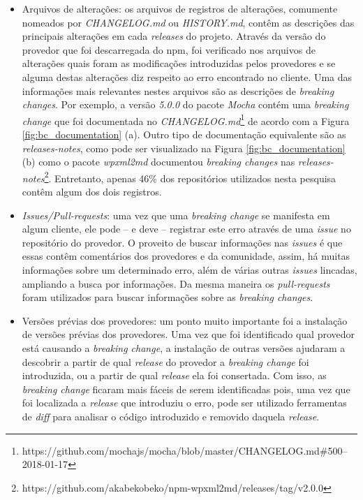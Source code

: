 \begin{itemize}
    \item Arquivos de alterações: os arquivos de registros de alterações, comumente nomeados por \textit{CHANGELOG.md} ou \textit{HISTORY.md}, contêm as descrições das principais alterações em cada \textit{releases} do projeto. Através da versão do provedor que foi descarregada do \gls{npm}, foi verificado nos arquivos de alterações quais foram as modificações introduzidas pelos provedores e se alguma destas alterações diz respeito ao erro encontrado no cliente. Uma das informações mais relevantes nestes arquivos são as descrições de \textit{breaking changes}. Por exemplo, a versão \textit{5.0.0} do pacote \textit{Mocha} contém uma \textit{breaking change} que foi documentada no \textit{CHANGELOG.md}\footnote{https://github.com/mochajs/mocha/blob/master/CHANGELOG.md\#500--2018-01-17} de acordo com a Figura \ref{fig:bc_documentation} (a). Outro tipo de documentação equivalente são as \textit{releases-notes}, como pode ser visualizado na Figura \ref{fig:bc_documentation} (b) como o pacote \textit{wpxml2md} documentou \textit{breaking changes} nas \textit{releases-notes}\footnote{https://github.com/akabekobeko/npm-wpxml2md/releases/tag/v2.0.0}. Entretanto, apenas 46\% dos repositórios utilizados nesta pesquisa contêm algum dos dois registros.

    \item \textit{Issues/Pull-requests}: uma vez que uma \textit{breaking change} se manifesta em algum cliente, ele pode -- e deve -- registrar este erro através de uma \textit{issue} no repositório do provedor. O proveito de buscar informações nas \textit{issues} é que essas contêm comentários dos provedores e da comunidade, assim, há muitas informações sobre um determinado erro, além de várias outras \textit{issues} lincadas, ampliando a busca por informações. Da mesma maneira os \textit{pull-requests} foram utilizados para buscar informações sobre as \textit{breaking changes}.

    \item Versões prévias dos provedores: um ponto muito importante foi a instalação de versões prévias dos provedores. Uma vez que foi identificado qual provedor está causando a \textit{breaking change}, a instalação de outras versões ajudaram a descobrir a partir de qual \textit{release} do provedor a \textit{breaking change} foi introduzida, ou a partir de qual \textit{release} ela foi consertada. Com isso, as \textit{breaking change} ficaram mais fáceis de serem identificadas pois, uma vez que foi localizada a \textit{release} que introduziu o erro, pode ser utilizado ferramentas de \textit{diff} para analisar o código introduzido e removido daquela \textit{release}.


\end{itemize}
